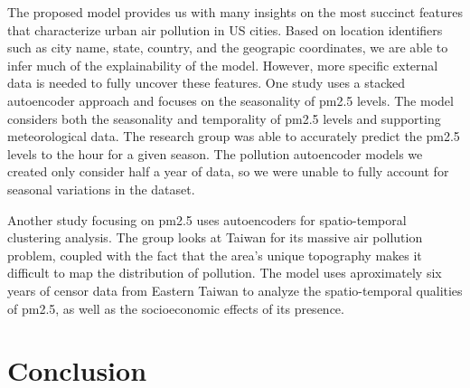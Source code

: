 \documentclass{article}
\begin{document}
\par The proposed model provides us with many insights on the most succinct features that characterize urban air pollution in US cities. Based on location identifiers such as city name, state, country, and the geograpic coordinates, we are able to infer much of the explainability of the model. However, more specific external data is needed to fully uncover these features. One study \parencite{Bai2019} uses a stacked autoencoder approach and focuses on the seasonality of pm2.5 levels. The model considers both the seasonality and temporality of pm2.5 levels and supporting meteorological data. The research group was able to accurately predict the pm2.5 levels to the hour for a given season. The pollution autoencoder models we created only consider half a year of data, so we were unable to fully account for seasonal variations in the dataset.
\par Another study focusing on pm2.5 \parencite{doreswamy2021} uses autoencoders for spatio-temporal clustering analysis. The group looks at Taiwan for its massive air pollution problem, coupled with the fact that the area's unique topography makes it difficult to map the distribution of pollution. The model uses aproximately six years of censor data from Eastern Taiwan to analyze the spatio-temporal qualities of pm2.5, as well as the socioeconomic effects of its presence.

\section{Conclusion}

\printbibliography
\end{document}
